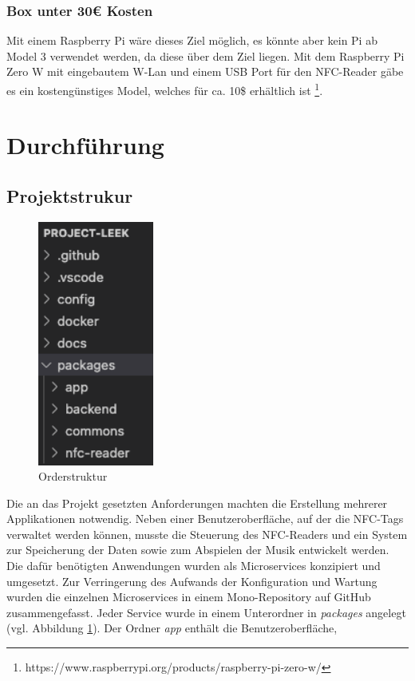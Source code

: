 \documentclass[10pt, a4paper]{article}
\begin{document}
\subsubsection{Box unter 30€ Kosten}
Mit einem Raspberry Pi wäre dieses Ziel möglich, es könnte aber kein Pi ab Model 3 verwendet werden, da diese über dem Ziel liegen.
Mit dem Raspberry Pi Zero W mit eingebautem W-Lan und einem USB Port für den NFC-Reader gäbe es ein kostengünstiges Model, welches für ca. 10\$ erhältlich ist \footnote{https://www.raspberrypi.org/products/raspberry-pi-zero-w/}.


\section{Durchführung}

\subsection{Projektstrukur}
\begin{figure}
  \includegraphics[width=3.8cm]{PackageStruktur.png}
  \caption{Orderstruktur}
  \label{fig:Orderstruktur}
\end{figure}
Die an das Projekt gesetzten Anforderungen machten die Erstellung mehrerer Applikationen notwendig. Neben einer Benutzeroberfläche, auf der die NFC-Tags
verwaltet werden können, musste die Steuerung des NFC-Readers und ein System zur Speicherung der Daten sowie zum Abspielen der Musik entwickelt werden.
Die dafür benötigten Anwendungen wurden als Microservices konzipiert und umgesetzt. Zur Verringerung des Aufwands der Konfiguration und Wartung wurden die einzelnen Microservices in einem Mono-Repository auf GitHub zusammengefasst.
Jeder Service wurde in einem Unterordner in \textit{packages} angelegt (vgl. Abbildung \ref{fig:Orderstruktur}). Der Ordner \textit{app} enthält die Benutzeroberfläche,
\end{document}
